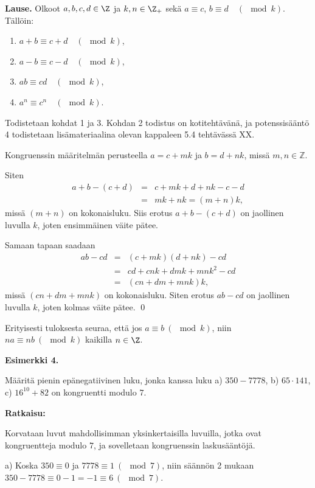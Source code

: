 {\bf Lause.} Olkoot $a,b,c,d\in \Z$ ja $k,n \in \Z_+$ sekä $a \equiv c$, $b \equiv d\quad (\mod k)$. Tällöin:

\begin{enumerate}
\item $a+b\equiv c+d\quad (\mod k)$,
\item $a-b\equiv c-d\quad (\mod k)$,
\item $ab \equiv cd\quad (\mod k)$,
\item $a^n \equiv c^n \quad (\mod k)$.

\end{enumerate}

\proof
Todistetaan kohdat 1 ja 3. Kohdan 2 todistus on kotitehtävänä, ja potenssisääntö 4 todistetaan lisämateriaalina olevan kappaleen 5.4 tehtävässä XX.

Kongruenssin määritelmän perusteella $a=c + mk$ ja $b= d + nk$, missä $m,n\in \mathbb{Z}$.

Siten
\begin{eqnarray*}
a+b - (c+d) &=& c + mk + d + nk - c - d\\ &=& mk + nk = (m+n)k,
\end{eqnarray*}
missä $(m+n)$ on kokonaisluku. Siis erotus $a + b - (c+d)$ on jaollinen luvulla $k$, joten ensimmäinen väite pätee.

Samaan tapaan saadaan
\begin{eqnarray*}
ab - cd &=& (c + mk)(d + nk) - cd\\ &=& cd +c nk + d mk + mnk^2 - cd\\ &=& (cn+dm+mnk)k,
\end{eqnarray*}
missä $(cn+dm+mnk)$ on kokonaisluku. Siten erotus $ab - cd$ on jaollinen luvulla $k$, joten kolmas väite pätee.
\qed


Erityisesti tuloksesta seuraa, että  jos $a\equiv b \ (\mod k)$, niin $na\equiv nb
\ (\mod k)$ kaikilla $n\in \Z$.


{\bf Esimerkki 4.}

Määritä pienin epänegatiivinen luku, jonka kanssa luku a) $350 - 7778$, b) $65 \cdot 141$, c) $16^{10} + 82$ on kongruentti modulo $7$.

{\bf Ratkaisu:}

Korvataan luvut mahdollisimman yksinkertaisilla luvuilla, jotka ovat kongruentteja modulo $7$, ja sovelletaan kongruenssin laskusääntöjä.

a)
Koska $350 \equiv 0$ ja $7778 \equiv 1 \ (\mod 7)$, niin säännön 2 mukaan $350 - 7778 \equiv 0 - 1 = -1 \equiv 6 \ (\mod 7)$.

